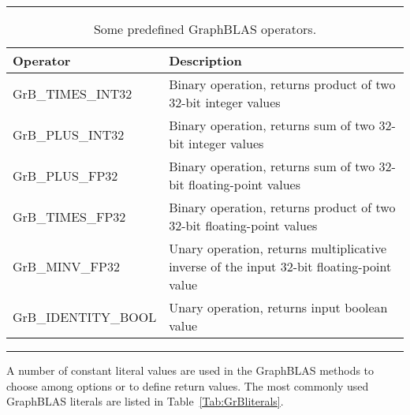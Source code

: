 \begin{table}[h]
\hrule
\begin{center}
\caption{Some predefined GraphBLAS operators.}
\label{Tab:GrBops}
\begin{tabular}{lp{5.25cm}}
Operator                       & Description  \\
\hline
	{\sf GrB\_TIMES\_INT32}    & Binary operation, returns  product of two 32-bit integer values \\
	{\sf GrB\_PLUS\_INT32}     & Binary operation, returns  sum of two 32-bit integer values \\
	{\sf GrB\_PLUS\_FP32}      & Binary operation, returns  sum of two 32-bit floating-point values \\
	{\sf GrB\_TIMES\_FP32}     & Binary operation, returns  product of two 32-bit floating-point values \\
	{\sf GrB\_MINV\_FP32}      & Unary operation, returns  multiplicative inverse of the input 32-bit floating-point value \\
	{\sf GrB\_IDENTITY\_BOOL}  & Unary operation, returns input boolean value \\
\end{tabular}
\end{center}
\hrule
\end{table}
A number of constant literal values are used in the GraphBLAS methods to 
choose among options or to define return values.
The most commonly used GraphBLAS literals are listed in Table~\ref{Tab:GrBliterals}.
